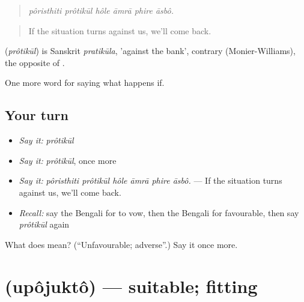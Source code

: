 \begin{quote}
     
\end{quote}

\begin{quote}
\emph{pôristhiti prôtikūl hôle āmrā phire āsbô.}
\end{quote}

\begin{quote}
If the situation turns against us, we'll come back.
\end{quote}

\begin{cousinweb}
\textbf{} (\emph{prôtikūl}) is Sanskrit \emph{pratikūla}, 'against the bank', contrary (Monier-Williams), the opposite of .
\end{cousinweb}

\begin{grammarlens}[title={What you've built}]
One more word for saying what happens if.
\end{grammarlens}

\subsection*{Your turn}
\begin{itemize}
\raggedright
  \item \emph{Say it:} \emph{prôtikūl}
  \item \emph{Say it:} \emph{prôtikūl}, once more
  \item \emph{Say it:} \emph{pôristhiti prôtikūl hôle āmrā phire āsbô.} — If the situation turns against us, we'll come back.
  \item \emph{Recall:} say the Bengali for to vow, then the Bengali for favourable, then say \emph{prôtikūl} again
\end{itemize}

\begin{tcolorbox}[breakable,colback=teal!4,colframe=teal!35!black,title={Before you move on}]
What does  mean? (\textquotedblleft{}Unfavourable; adverse\textquotedblright{}.) Say it once more.
\end{tcolorbox}
\section[\texorpdfstring{\bn{উপযুক্ত} (upôjuktô)}{উপযুক্ত (upôjuktô)}]{ (upôjuktô) — suitable; fitting}

\label{lesson:BN-C380-upojukto}



